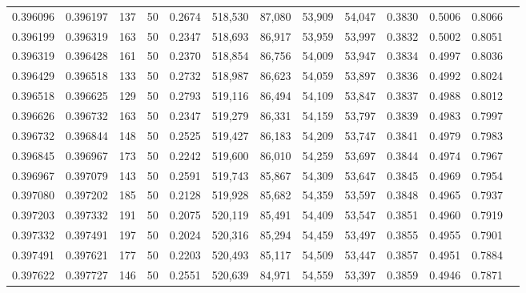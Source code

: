 \begin{tabular}{rrrrrrrrrrrrr}
0.396096 & 0.396197 &   137 &  50 &                                     0.2674 & 518,530 &  87,080 &  53,909 &  54,047 & 0.3830 & 0.5006 & 0.8066 \\
0.396199 & 0.396319 &   163 &  50 &                                     0.2347 & 518,693 &  86,917 &  53,959 &  53,997 & 0.3832 & 0.5002 & 0.8051 \\
0.396319 & 0.396428 &   161 &  50 &                                     0.2370 & 518,854 &  86,756 &  54,009 &  53,947 & 0.3834 & 0.4997 & 0.8036 \\
0.396429 & 0.396518 &   133 &  50 &                                     0.2732 & 518,987 &  86,623 &  54,059 &  53,897 & 0.3836 & 0.4992 & 0.8024 \\
0.396518 & 0.396625 &   129 &  50 &                                     0.2793 & 519,116 &  86,494 &  54,109 &  53,847 & 0.3837 & 0.4988 & 0.8012 \\
0.396626 & 0.396732 &   163 &  50 &                                     0.2347 & 519,279 &  86,331 &  54,159 &  53,797 & 0.3839 & 0.4983 & 0.7997 \\
0.396732 & 0.396844 &   148 &  50 &                                     0.2525 & 519,427 &  86,183 &  54,209 &  53,747 & 0.3841 & 0.4979 & 0.7983 \\
0.396845 & 0.396967 &   173 &  50 &                                     0.2242 & 519,600 &  86,010 &  54,259 &  53,697 & 0.3844 & 0.4974 & 0.7967 \\
0.396967 & 0.397079 &   143 &  50 &                                     0.2591 & 519,743 &  85,867 &  54,309 &  53,647 & 0.3845 & 0.4969 & 0.7954 \\
0.397080 & 0.397202 &   185 &  50 &                                     0.2128 & 519,928 &  85,682 &  54,359 &  53,597 & 0.3848 & 0.4965 & 0.7937 \\
0.397203 & 0.397332 &   191 &  50 &                                     0.2075 & 520,119 &  85,491 &  54,409 &  53,547 & 0.3851 & 0.4960 & 0.7919 \\
0.397332 & 0.397491 &   197 &  50 &                                     0.2024 & 520,316 &  85,294 &  54,459 &  53,497 & 0.3855 & 0.4955 & 0.7901 \\
0.397491 & 0.397621 &   177 &  50 &                                     0.2203 & 520,493 &  85,117 &  54,509 &  53,447 & 0.3857 & 0.4951 & 0.7884 \\
0.397622 & 0.397727 &   146 &  50 &                                     0.2551 & 520,639 &  84,971 &  54,559 &  53,397 & 0.3859 & 0.4946 & 0.7871 \\

\end{tabular}
